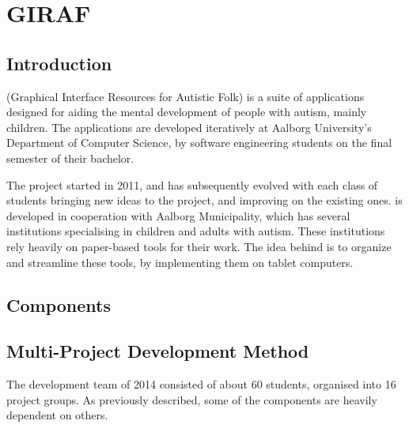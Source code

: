 \chapter{GIRAF}\label{chap:giraf}

\section{Introduction}\label{sec:giraf:introduction}
\giraf (Graphical Interface Resources for Autistic Folk) is a suite of applications designed for aiding the mental development of people with autism, mainly children. The applications are developed iteratively at Aalborg University's Department of Computer Science, by software engineering students on the final semester of their bachelor.

The project started in 2011, and has subsequently evolved with each class of students bringing new ideas to the project, and improving on the existing ones.
\giraf is developed in cooperation with Aalborg Municipality, which has several institutions specialising in children and adults with autism. 
These institutions rely heavily on paper-based tools for their work. 
The idea behind \giraf is to organize and streamline these tools, by implementing them on tablet computers.

\section{\giraf Components}\label{sec:giraf:components}

\section{Multi-Project Development Method}\label{sec:giraf:development}
The \giraf development team of 2014 consisted of about 60 students, organised into 16 project groups. As previously described, some of the \giraf components are heavily dependent on others. 



